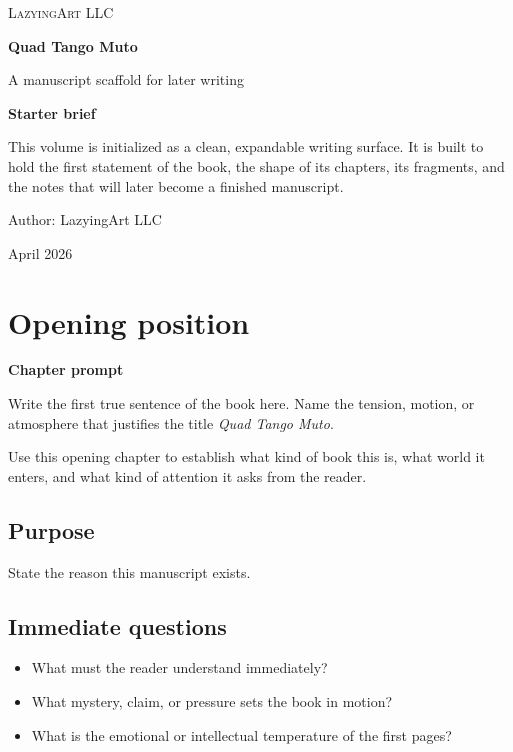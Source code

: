 \documentclass[11pt,openany]{book}
\newcommand{\chapterprompt}[1]{
\begin{chapterbox}
\textbf{Chapter prompt}\par
#1
\end{chapterbox}
}
\begin{document}
\frontmatter

\begin{titlepage}
\pagecolor{paper}
\color{ink}
\thispagestyle{empty}
\vspace*{2.2cm}
{\sffamily\Large\color{ember}\textsc{LazyingArt LLC}\par}
\vspace{1.6cm}
{\sffamily\bfseries\fontsize{34}{38}\selectfont Quad Tango Muto\par}
\vspace{0.45cm}
{\Large A manuscript scaffold for later writing\par}
\vspace{1.4cm}
\begin{coverbox}
\textbf{Starter brief}\par
This volume is initialized as a clean, expandable writing surface. It is built to hold the first statement of the book, the shape of its chapters, its fragments, and the notes that will later become a finished manuscript.
\end{coverbox}
\vfill
{\large Author: LazyingArt LLC\par}
{\large April 2026\par}
\end{titlepage}
\nopagecolor

\tableofcontents

\mainmatter

\chapter{Opening position}
\chapterprompt{Write the first true sentence of the book here. Name the tension, motion, or atmosphere that justifies the title \textit{Quad Tango Muto}.}

Use this opening chapter to establish what kind of book this is, what world it enters, and what kind of attention it asks from the reader.

\section{Purpose}

State the reason this manuscript exists.

\section{Immediate questions}

\begin{itemize}
  \item What must the reader understand immediately?
  \item What mystery, claim, or pressure sets the book in motion?
  \item What is the emotional or intellectual temperature of the first pages?
\end{itemize}
\end{document}
